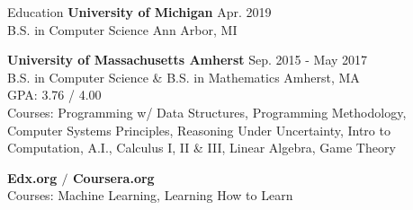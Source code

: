\documentclass{resume} %
\begin{document}
	
	

	\begin{rSection}{Education}
		{\bf University of Michigan} \hfill {Apr. 2019} \\ 
		B.S. in Computer Science \hfill {Ann Arbor, MI}
		
		{\bf University of Massachusetts Amherst} \hfill {Sep. 2015 - May 2017} \\ 
		B.S. in Computer Science \& B.S. in Mathematics \hfill {Amherst, MA} \\
		GPA: 3.76 / 4.00 \smallskip \\
		Courses: Programming w/ Data Structures, Programming Methodology, Computer Systems Principles, Reasoning Under Uncertainty, Intro to Computation, A.I., Calculus I, II \& III, Linear Algebra, Game Theory
		
		\textbf{Edx.org $/$ Coursera.org} \\
		Courses: Machine Learning, Learning How to Learn
	\end{rSection}
	
	
	
	
\end{document}

